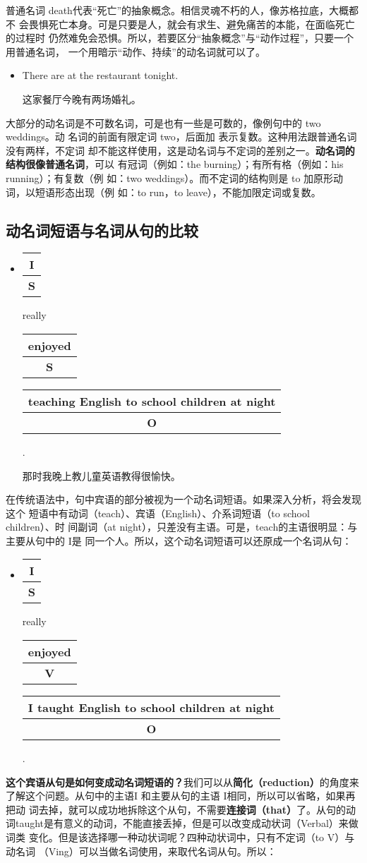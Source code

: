 \documentclass{yufa}
\makeatletter
\newcommand\unct[2]{\def\arraystretch{0.8}
  {\setlength{\tabcolsep}{0pt}
    \begin{tabular}[t]{@{}c@{}} \setlength\arrayrulewidth{0.8pt} \textbf{#1}\\\hline \textbf{\small #2} \\\end{tabular}}}
\newcommand\unbf[1]{\CJKunderline[thickness=0.8pt, textformat=\bfseries]{#1}}
\makeatother
\begin{document}
普通名词 death代表“死亡”的抽象概念。相信灵魂不朽的人，像苏格拉底，大概都不
会畏惧死亡本身。可是只要是人，就会有求生、避免痛苦的本能，在面临死亡的过程时
仍然难免会恐惧。所以，若要区分“抽象概念”与“动作过程”，只要一个用普通名词，
一个用暗示“动作、持续”的动名词就可以了。

\begin{itemize}
\item  There are \unbf{two weddings} at the restaurant tonight.

这家餐厅今晚有两场婚礼。
\end{itemize}

大部分的动名词是不可数名词，可是也有一些是可数的，像例句中的 two weddings。动
名词的前面有限定词 two，后面加 表示复数。这种用法跟普通名词没有两样，不定词
却不能这样使用，这是动名词与不定词的差别之一。\textbf{动名词的结构很像普通名词}，可以
有冠词（例如：the burning）；有所有格（例如：his running）；有复数（例
如：two weddings）。而不定词的结构则是 to 加原形动词，以短语形态出现（例
如：to run，to leave），不能加限定词或复数。

\subsection{动名词短语与名词从句的比较}

\begin{itemize}
\item  \unct{I}{S} really \unct{enjoyed}{S} \unct{teaching English to school children at night}{O}.

  那时我晚上教儿童英语教得很愉快。
\end{itemize}

在传统语法中，句中宾语的部分被视为一个动名词短语。如果深入分析，将会发现这个
短语中有动词（teach）、宾语（English）、介系词短语（to school children）、时
间副词（at night），只差没有主语。可是，teach的主语很明显：与主要从句中的 I是
同一个人。所以，这个动名词短语可以还原成一个名词从句：

\begin{itemize}
\item \unct{I}{S} really \unct{enjoyed}{V} \unct{I taught English to school
    children at night}{O}.
\end{itemize}

\textbf{这个宾语从句是如何变成动名词短语的？}我们可以从\textbf{简化（reduction）}的角度来
了解这个问题。从句中的主语I 和主要从句的主语 I相同，所以可以省略，如果再把动
词去掉，就可以成功地拆除这个从句，不需要\textbf{连接词（that）}了。从句的动
词taught是有意义的动词，不能直接丢掉，但是可以改变成动状词（Verbal）来做词类
变化。但是该选择哪一种动状词呢？四种动状词中，只有不定词（to V）与动名词
（Ving）可以当做名词使用，来取代名词从句。所以：
\end{document}
